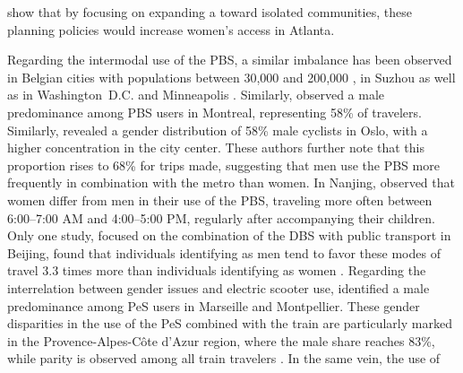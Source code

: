 \begin{refsegment}
\textcolor{blue}{\autocite[59]{bearn_adaption_2018}} show that by focusing on expanding a  toward isolated communities, these planning policies would increase women's access in Atlanta.%

Regarding the intermodal use of the \acrshort{PBS}, a similar imbalance has been observed in Belgian cities with populations between 30,000 and 200,000 \textcolor{blue}{\autocite[6]{adnan_last-mile_2019}}, in Suzhou \textcolor{blue}{\autocite[9]{ma_measuring_2018}} as well as in Washington~D.C. and Minneapolis \textcolor{blue}{\autocite[322]{martin_evaluating_2014}}. Similarly, \textcolor{blue}{\textcite[111]{bachand-marleau_much-anticipated_2011}} observed a male predominance among \acrshort{PBS} users in Montreal, representing 58\% of travelers. Similarly, \textcolor{blue}{\textcite[393]{bocker_bike_2020}} revealed a gender distribution of 58\% male cyclists in Oslo, with a higher concentration in the city center. These authors further note that this proportion rises to 68\% for trips made, suggesting that men use the \acrshort{PBS} more frequently in combination with the metro than women. In Nanjing, \textcolor{blue}{\textcite[64]{ma_understanding_2018}} observed that women differ from men in their use of the \acrshort{PBS}, traveling more often between 6:00–7:00 AM and 4:00–5:00 PM, regularly after accompanying their children. Only one study, focused on the combination of the \acrshort{DBS} with public transport in Beijing, found that individuals identifying as men tend to favor these modes of travel 3.3 times more than individuals identifying as women \textcolor{blue}{\autocite[10]{fan_how_2019}}. Regarding the interrelation between gender issues and electric scooter use, \textcolor{blue}{\textcite[12]{pages_nouveaux_2021}} identified a male predominance among \acrshort{PeS} users in Marseille and Montpellier. These gender disparities in the use of the \acrshort{PeS} combined with the train are particularly marked in the Provence-Alpes-Côte d'Azur region, where the male share reaches 83\%, while parity is observed among all train travelers \textcolor{blue}{\autocite[183]{moinse_intermodal_2022}}. In the same vein, the use of 
\end{refsegment}
